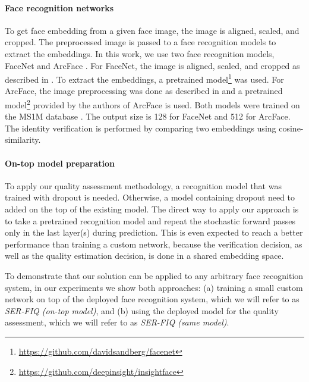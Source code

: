 \documentclass[10pt,twocolumn,letterpaper]{article}
\begin{document}
\paragraph{Face recognition networks}
To get face embedding from a given face image, the image is aligned, scaled, and cropped. 
The preprocessed image is passed to a face recognition models to extract the embeddings.
In this work, we use two face recognition models, FaceNet \cite{DBLP:journals/corr/SchroffKP15} and ArcFace \cite{Deng_2019_CVPR}.
For FaceNet, the image is aligned, scaled, and cropped as described in \cite{Kazemi2014OneMF}.
To extract the embeddings, a pretrained model\footnote{\url{https://github.com/davidsandberg/facenet}} was used.
For ArcFace, the image preprocessing was done as described in \cite{DBLP:journals/corr/abs-1812-01936} and a pretrained model\footnote{\url{https://github.com/deepinsight/insightface}} provided by the authors of ArcFace is used.
Both models were trained on the MS1M database \cite{DBLP:journals/corr/GuoZHHG16}.
The output size is 128 for FaceNet and 512 for ArcFace.
The identity verification is performed by comparing two embeddings using cosine-similarity.


\paragraph{On-top model preparation}
To apply our quality assessment methodology, a recognition model that was trained with dropout \cite{Srivastava:2014:DSW:2627435.2670313} is needed.
Otherwise, a model containing dropout need to added on the top of the existing model.
The direct way to apply our approach is to take a pretrained recognition model and repeat the stochastic forward passes only in the last layer(s) during prediction.
This is even expected to reach a better performance than training a custom network, because the verification decision, as well as the quality estimation decision, is done in a shared embedding space.

To demonstrate that our solution can be applied to any arbitrary face recognition system, in our experiments we show both approaches:
(a) training a small custom network on top of the deployed face recognition system, which we will refer to as \textit{SER-FIQ (on-top model)}, and (b) using the deployed model for the quality assessment, which we will refer to as \textit{SER-FIQ (same model)}. 
\end{document}

